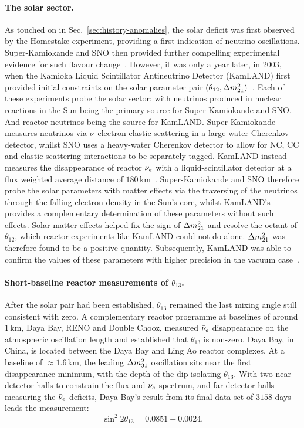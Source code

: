 \paragraph{The solar sector.}
As touched on in Sec.~\ref{sec:history-anomalies}, the solar deficit was first observed
by the Homestake experiment, providing a first indication of neutrino oscillations.
Super-Kamiokande and SNO then provided further compelling experimental evidence for such
flavour change~\cite{Fukuda2001,Ahmad2002}. However, it was only a year later, in 2003, when
the Kamioka Liquid Scintillator Antineutrino Detector (KamLAND) first provided initial
constraints on the solar parameter pair $(\theta_{12},\Delta m^{2}_{21})$~\cite{KamLAND2003}. 
Each of these experiments probe the solar sector; with neutrinos produced in nuclear reactions 
in the Sun being the primary source for Super-Kamiokande and SNO. And reactor neutrinos being the 
source for KamLAND. Super-Kamiokande measures neutrinos via $\nu$--electron elastic scattering in 
a large water Cherenkov detector, whilst SNO uses a heavy-water Cherenkov detector to allow for NC, 
CC and elastic scattering interactions to be separately tagged. KamLAND instead measures the disappearance
of reactor $\bar\nu_e$ with a liquid-scintillator detector at a flux weighted average distance of 
$180$\,km~\cite{KamLAND2003}. Super-Kamiokande and SNO therefore probe the solar parameters 
with matter effects via the traversing of the neutrinos through the falling electron density in 
the Sun's core, whilst KamLAND's provides a complementary determination of these parameters 
without such effects. Solar matter effects helped fix the sign of $\Delta m^{2}_{21}$ and resolve the octant
of $\theta_{12}$, which reactor experiments like KamLAND could not do alone. $\Delta m^{2}_{21}$ was therefore
found to be a positive quantity. Subsequently, KamLAND was able to confirm the values of these
parameters with higher precision in the vacuum case~\cite{KamLAND2013}.

\paragraph{Short-baseline reactor measurements of $\theta_{13}$.}
After the solar pair had been established, $\theta_{13}$ remained the last mixing
angle still consistent with zero. A complementary reactor programme at baselines
of around $1$\,km, Daya Bay, RENO and Double Chooz, measured $\bar\nu_e$
disappearance on the atmospheric oscillation length and established that
$\theta_{13}$ is non-zero. Daya Bay, in China, is located between the Daya Bay
and Ling Ao reactor complexes. At a baseline of $\approx 1.6$\,km, the leading
$\Delta m^{2}_{31}$ oscillation sits near the first disappearance minimum, with the depth
of the dip isolating $\theta_{13}$. With two near detector halls to constrain
the flux and $\bar\nu_e$ spectrum, and far detector halls measuring the
$\bar\nu_e$ deficits, Daya Bay's result from its final data set of $3158$
days~\cite{DayaBay2023} leads the measurement:
\begin{equation}
    \sin^{2}2\theta_{13} = 0.0851 \pm 0.0024.
    \label{eq:dayabay-theta13}
\end{equation}





